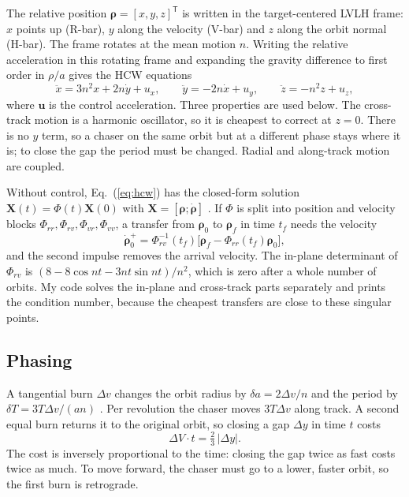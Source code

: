 \documentclass[letterpaper,10pt]{article}
\newcommand{\vv}[1]{\bm{#1}}
\newcommand{\Tp}{^{\mathsf{T}}}
\begin{document}
The relative position $\vv{\rho} = [x, y, z]\Tp$ is written in the
target-centered LVLH frame: $x$ points up (R-bar), $y$ along the velocity
(V-bar) and $z$ along the orbit normal (H-bar). The frame rotates at the mean
motion $n$. Writing the relative acceleration in this rotating frame and
expanding the gravity difference to first order in $\rho/a$ gives the HCW
equations \cite{clohessy,curtis}
\begin{equation}
  \ddot x = 3n^2x + 2n\dot y + u_x, \qquad
  \ddot y = -2n\dot x + u_y, \qquad
  \ddot z = -n^2 z + u_z ,
  \label{eq:hcw}
\end{equation}
where $\vv{u}$ is the control acceleration. Three properties are used below.
The cross-track motion is a harmonic oscillator, so it is cheapest to correct
at $z = 0$. There is no $y$ term, so a chaser on the same orbit but at a
different phase stays where it is; to close the gap the period must be
changed. Radial and along-track motion are coupled.

Without control, Eq.~(\ref{eq:hcw}) has the closed-form solution
$\vv{X}(t) = \Phi(t)\vv{X}(0)$ with $\vv{X} = [\vv{\rho};\dot{\vv{\rho}}]$
\cite{vallado}. If $\Phi$ is split into position and velocity blocks
$\Phi_{rr}, \Phi_{rv}, \Phi_{vr}, \Phi_{vv}$, a transfer from
$\vv{\rho}_0$ to $\vv{\rho}_f$ in time $t_f$ needs the velocity
\begin{equation}
  \dot{\vv{\rho}}_0^{+} = \Phi_{rv}^{-1}(t_f)\bigl[\vv{\rho}_f - \Phi_{rr}(t_f)\vv{\rho}_0\bigr],
  \label{eq:twoimp}
\end{equation}
and the second impulse removes the arrival velocity. The in-plane
determinant of $\Phi_{rv}$ is $(8 - 8\cos nt - 3nt\sin nt)/n^2$, which is zero
after a whole number of orbits. My code solves the in-plane and cross-track
parts separately and prints the condition number, because the cheapest
transfers are close to these singular points.

\subsection{Phasing}

A tangential burn $\Delta v$ changes the orbit radius by
$\delta a = 2\Delta v/n$ and the period by $\delta T = 3T\Delta v/(an)$
\cite{curtis}. Per revolution the chaser moves $3T\Delta v$ along track. A
second equal burn returns it to the original orbit, so closing a gap
$\Delta y$ in time $t$ costs
\begin{equation}
  \Delta V \cdot t = \tfrac{2}{3}\,|\Delta y| .
  \label{eq:trade}
\end{equation}
The cost is inversely proportional to the time: closing the gap twice as
fast costs twice as much. To move forward, the chaser must go to a lower,
faster orbit, so the first burn is retrograde.
\end{document}

